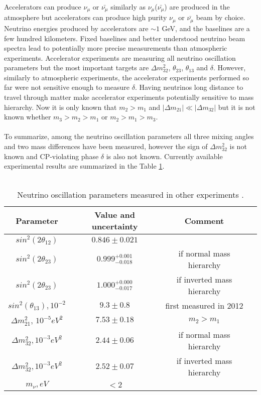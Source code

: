 Accelerators can produce $\nu_\mu$ or $\bar{\nu_\mu}$ similarly as $\nu_\mu$($\bar{\nu_\mu}$) are produced in the atmosphere but accelerators can produce high purity $\nu_\mu$ or $\bar{\nu_\mu}$ beam by choice. Neutrino energies produced by accelerators are $\sim 1$ GeV, and the baselines are a few hundred kilometers. Fixed baselines and better understood neutrino beam spectra lead to potentially more precise measurements than atmospheric experiments. Accelerator experiments are measuring all neutrino oscillation parameters but the most important targets are ${\Delta}m^2_{32}$, $\theta_{23}$, $\theta_{13}$ and $\delta$. However, similarly to atmospheric experiments, the accelerator experiments performed so far were not sensitive enough to measure $\delta$. Having neutrinos long distance to travel through matter make accelerator experiments potentially sensitive to mass hierarchy. Now it is only known that $m_2>m_1$ and $|{\Delta}m_{21}| \ll |{\Delta}m_{32}|$ but it is not known whether $m_3>m_2>m_1$ or $m_2>m_1>m_3$.\\ \\
To summarize, among the neutrino oscillation parameters all three mixing angles and two mass differences have been measured, however the sign of ${\Delta}m^2_{32}$ is not known and CP-violating phase $\delta$ is also not known. Currently available experimental results are summarized in the Table \ref{tab:MeasuredPars}.\\ \\
\begin{table}[h]
  \begin{center}
  \caption{ Neutrino oscillation parameters measured in other experiments \cite{ref_PDG}.}
  \begin{tabular}{|c|c|c|c|}
     Parameter & Value and uncertainty & Comment \\ \hline
     $sin^2(2\theta_{12})$ &  $0.846\pm0.021$ & \\ \hline 
     $sin^2(2\theta_{23})$ &  $0.999${\tiny{$^{+0.001}_{-0.018}$}} & if normal mass hierarchy \\ \hline 
     $sin^2(2\theta_{23})$ &  $1.000${\tiny{$^{+0.000}_{-0.017}$}}  & if inverted mass hierarchy \\ \hline 
     $sin^2(\theta_{13}), 10^{-2}$ &  $9.3\pm0.8$  & first measured in 2012\\ \hline 
     ${\Delta}m^2_{21}$, $10^{-5} eV^2$ &  $7.53\pm0.18$  &  $m_{2}>m_{1}$   \\ \hline 
     ${\Delta}m^2_{32}, 10^{-3} eV^2$ &  $2.44\pm0.06$  &  if normal mass hierarchy     \\ \hline
     ${\Delta}m^2_{32}, 10^{-3} eV^2$ &  $2.52\pm0.07$  &  if inverted mass hierarchy     \\ \hline
     $m_\nu, eV$ &  $<2$  &      \\ \hline 
  \end{tabular}
  \label{tab:MeasuredPars}
  \end{center}
\end{table}
